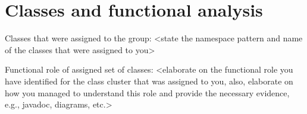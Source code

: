 \chapter{Classes and functional analysis}



Classes that were assigned to the group: <state the namespace pattern and name of the classes that were assigned to you>

Functional role of assigned set of classes: <elaborate on the functional role you have identified for the class cluster that was assigned to you, also, elaborate on how you managed to understand this role and provide the necessary evidence, e.g., javadoc, diagrams, etc.>

\lipsum[1-4]